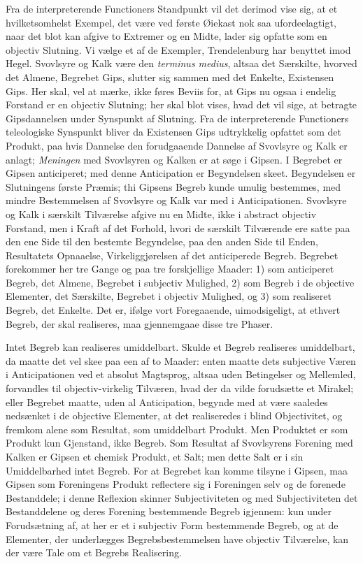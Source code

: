 \documentclass[12pt]{book}
\newcommand{\opage}[1]{\marginnote{\footnotesize\textit{[#1]}}}
\begin{document}
\opage{392}Fra de interpreterende Functioners Standpunkt vil det derimod vise sig, at et hvilketsomhelst Exempel, det være ved første Øiekast nok saa ufordeelagtigt, naar det blot kan afgive
\opage{393}to Extremer og en Midte, lader sig opfatte som en objectiv Slutning. Vi vælge et af de Exempler, Trendelenburg har benyttet imod Hegel. Svovlsyre og Kalk være den \textit{terminus medius}, altsaa det Særskilte, hvorved det Almene, Begrebet Gips, slutter sig sammen med det Enkelte, Existensen Gips. Her skal, vel at mærke, ikke føres Beviis for, at Gips nu ogsaa i endelig Forstand er en objectiv Slutning; her skal blot vises, hvad det vil sige, at betragte Gipsdannelsen under Synspunkt af Slutning. Fra de interpreterende Functioners teleologiske Synspunkt bliver da Existensen Gips udtrykkelig opfattet som det Produkt, paa hvis Dannelse den forudgaaende Dannelse af Svovlsyre og Kalk er anlagt; \emph{Meningen} med Svovlsyren og Kalken er at søge i Gipsen. I Begrebet er Gipsen anticiperet; med denne Anticipation er Begyndelsen skeet. Begyndelsen er Slutningens første Præmis; thi Gipsens Begreb kunde umulig bestemmes, med mindre Bestemmelsen af Svovlsyre og Kalk var med i Anticipationen. Svovlsyre og Kalk i særskilt Tilværelse afgive nu en Midte, ikke i abstract objectiv Forstand, men i Kraft af det Forhold, hvori de særskilt Tilværende ere satte paa den ene Side til den bestemte Begyndelse, paa den anden Side til Enden, Resultatets Opnaaelse, Virkeliggjørelsen af det anticiperede Begreb. Begrebet forekommer her tre Gange og paa tre forskjellige Maader: 1) som anticiperet Begreb, det Almene, Begrebet i subjectiv Mulighed, 2) som Begreb i de objective Elementer, det Særskilte, Begrebet i objectiv Mulighed, og 3) som realiseret Begreb, det Enkelte. Det er, ifølge vort Foregaaende, uimodsigeligt, at ethvert Begreb, der skal realiseres, maa gjennemgaae disse tre Phaser.

Intet Begreb kan realiseres umiddelbart. Skulde et Begreb realiseres umiddelbart, da maatte det vel skee paa een af to Maader: enten maatte dets subjective Væren i Anticipationen ved et absolut Magtsprog, altsaa uden Betingelser og Mellemled, forvandles til objectiv-virkelig Tilværen, hvad
\opage{394}der da vilde forudsætte et Mirakel; eller Begrebet maatte, uden al Anticipation, begynde med at være saaledes nedsænket i de objective Elementer, at det realiseredes i blind Objectivitet, og fremkom alene som Resultat, som umiddelbart Produkt. Men Produktet er som Produkt kun Gjenstand, ikke Begreb. Som Resultat af Svovlsyrens Forening med Kalken er Gipsen et chemisk Produkt, et Salt; men dette Salt er i sin Umiddelbarhed intet Begreb. For at Begrebet kan komme tilsyne i Gipsen, maa Gipsen som Foreningens Produkt reflectere sig i Foreningen selv og de forenede Bestanddele; i denne Reflexion skinner Subjectiviteten og med Subjectiviteten det Bestanddelene og deres Forening bestemmende Begreb igjennem: kun under Forudsætning af, at her er et i subjectiv Form bestemmende Begreb, og at de Elementer, der underlægges Begrebsbestemmelsen have objectiv Tilværelse, kan der være Tale om et Begrebs Realisering.
\end{document}
